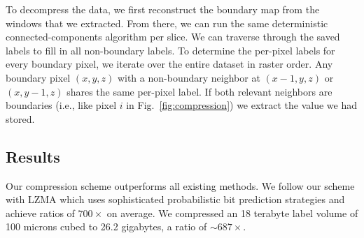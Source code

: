 To decompress the data, we first reconstruct the boundary map from the windows that we extracted.
From there, we can run the same deterministic connected-components algorithm per slice.
We can traverse through the saved labels to fill in all non-boundary labels.
To determine the per-pixel labels for every boundary pixel, we iterate over the entire dataset in raster order. 
Any boundary pixel $(x, y, z)$ with a non-boundary neighbor at $(x - 1, y, z)$ or $(x, y - 1, z)$ shares the same per-pixel label. 
If both relevant neighbors are boundaries (i.e., like pixel $i$ in Fig.~\ref{fig:compression}) we extract the value we had stored.

\subsection{Results}

Our compression scheme outperforms all existing methods.
We follow our scheme with LZMA which uses sophisticated probabilistic bit prediction strategies and achieve ratios of $700\times$ on average.
We compressed an 18 terabyte label volume of 100 microns cubed to 26.2 gigabytes, a ratio of $\sim687\times$. 
